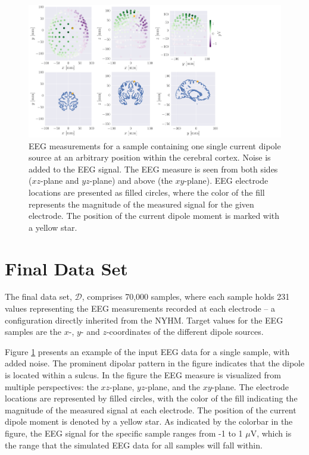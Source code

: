 \documentclass[a4paper, UKenglish, 11pt]{uiomaster}
\begin{document}
\begin{figure}[!htb]
    \centering
    \hspace*{-3cm}
    \includegraphics[width=18cm]{figures/purple_green/simple_example.pdf}
    \caption{EEG measurements for a sample containing one single current dipole source at an arbitrary position within the cerebral cortex. Noise is added to the EEG signal. The EEG measure is seen from both sides ($xz$-plane and $yz$-plane) and above (the $xy$-plane). EEG electrode locations are presented as filled circles, where the color of the fill represents the magnitude of the measured signal for the given electrode. The position of the current dipole moment is marked with a yellow star.}
    \label{fig:eeg_field_1_dipole_example}
\end{figure}


\section{Final Data Set} \label{chap:final_data}
The final data set, $\mathcal{D}$, comprises 70,000 samples, where each sample holds 231 values representing the EEG measurements recorded at each electrode -- a configuration directly inherited from the NYHM. Target values for the EEG samples are the $x$-, $y$- and $z$-coordinates of the different dipole sources.

Figure \ref{fig:eeg_field_1_dipole_example} presents an example of the input EEG data for a single sample, with added noise. The prominent dipolar pattern in the figure indicates that the dipole is located within a sulcus. In the figure the EEG measure is visualized from multiple perspectives: the $xz$-plane, $yz$-plane, and the $xy$-plane. The electrode locations are represented by filled circles, with the color of the fill indicating the magnitude of the measured signal at each electrode. The position of the current dipole moment is denoted by a yellow star. As indicated by the colorbar in the figure, the EEG signal for the specific sample ranges from -1 to 1 $\mu$V, which is the range that the simulated EEG data for all samples will fall within.
\end{document}
